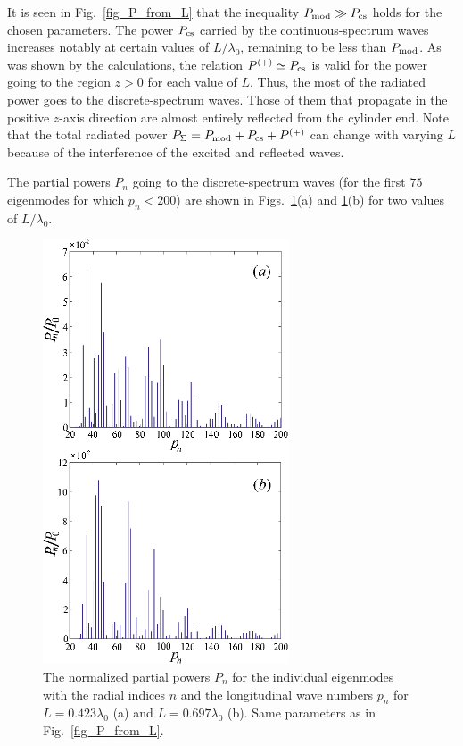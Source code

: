 \documentclass[summary]{URSIGASS2020}
\begin{document}
It is seen in Fig.~\ref{fig_P_from_L} that the inequality $ P_{\rm mod}\gg P_{\rm cs} $ holds for the chosen parameters.
The power $ P_{\rm cs} $ carried by the continuous-spectrum waves increases notably at certain values of $ L/\lambda_{0} $, remaining to be less than $ P_{\rm mod} $.
As was shown by the calculations, the relation $ P^{(+)} \simeq P_{\rm cs} $ is valid for the power going to the region $ z>0 $ for each value of $ L $.
Thus, the most of the radiated power goes to the discrete-spectrum waves. Those of them that propagate in the positive $ z $-axis direction are almost entirely reflected from the cylinder end.
Note that the total radiated power $ P_{\Sigma}=P_{\rm mod}+ P_{\rm cs}+P^{(+)}  $ can change with varying $ L $ because of the interference of the excited and reflected waves.

The partial powers $P_n$ going to the discrete-spectrum waves (for the first $ 75 $ eigenmodes for which $ p_{n}<200 $) are shown in Figs.~\ref{fig_P_mod}(a) and \ref{fig_P_mod}(b) for two values of $ L/\lambda_{0} $.
\begin{figure}[tbp]
	\centering
	\includegraphics[width=73mm]{figures/fig_P_mod.eps}
	\caption{The normalized partial powers $P_n$ for the individual eigenmodes with the radial indices $ n $ and the longitudinal wave numbers $ p_n $ for $ L=0{.}423\lambda_{0} $ (a) and $ L=0{.}697\lambda_{0} $ (b). Same parameters as in Fig.~\ref{fig_P_from_L}.}
	\label{fig_P_mod}
\end{figure}
\end{document}
